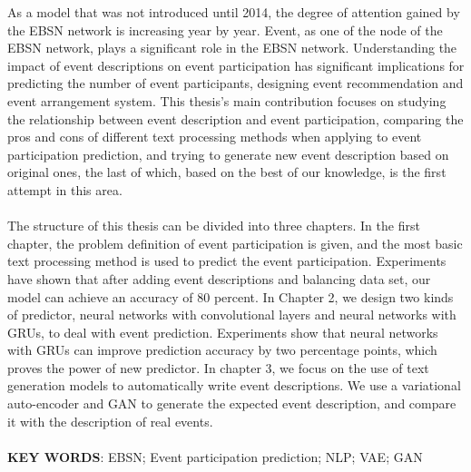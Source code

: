 \begin{myparindent}{0pt}
As a model that was not introduced until 2014, the degree of attention gained by the EBSN network is increasing year by year. Event, as one of the node of the EBSN network, plays a significant role in the EBSN network. Understanding the impact of event descriptions on event participation has significant implications for predicting the number of event participants, designing event recommendation and event arrangement system. This thesis's main contribution focuses on studying the relationship between event description and event participation, comparing the pros and cons of different text processing methods when applying to event participation prediction, and trying to generate new event description based on original ones, the last of which, based on the best of our knowledge, is the first attempt in this area.
\\
\\
The structure of this thesis can be divided into three chapters. In the first chapter, the problem definition of event participation is given, and the most basic text processing method is used to predict the event participation. Experiments have shown that after adding event descriptions and balancing data set, our model can achieve an accuracy of 80 percent. In Chapter 2, we design two kinds of predictor, neural networks with convolutional layers and neural networks with GRUs, to deal with event prediction. Experiments show that neural networks with GRUs can improve prediction accuracy by two percentage points, which proves the power of new predictor. In chapter 3, we focus on the use of text generation models to automatically write event descriptions. We use a variational auto-encoder and GAN to generate the expected event description, and compare it with the description of real events.
\\
\\
\textbf{KEY WORDS}: EBSN; Event participation prediction; NLP; VAE; GAN 
\end{myparindent}
% 